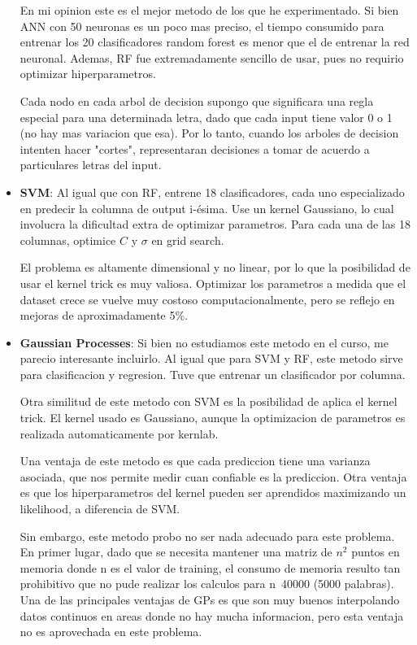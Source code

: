 \documentclass[paper=a4, fontsize=11pt]{scrartcl} %
\numberwithin{equation}{section} %
\numberwithin{figure}{section} %
\numberwithin{table}{section} %
\begin{document}
\begin{itemize}
En mi opinion este es el mejor metodo de los que he experimentado. Si bien ANN con 50 neuronas es un poco mas preciso, el tiempo consumido para entrenar los 20 clasificadores random forest es menor que el de entrenar la red neuronal. Ademas, RF fue extremadamente sencillo de usar, pues no requirio optimizar hiperparametros.

Cada nodo en cada arbol de decision supongo que significara una regla especial para una determinada letra, dado que cada input tiene valor 0 o 1 (no hay mas variacion que esa). Por lo tanto, cuando los arboles de decision intenten hacer "cortes", representaran decisiones a tomar de acuerdo a particulares letras del input.

\item \textbf{SVM}: Al igual que con RF, entrene 18 clasificadores, cada uno especializado en predecir la columna de output i-ésima. Use un kernel Gaussiano, lo cual involucra la dificultad extra de optimizar parametros. Para cada una de las 18 columnas, optimice $C$ y $\sigma$ en grid search.

El problema es altamente dimensional y no linear, por lo que la posibilidad de usar el kernel trick es muy valiosa. Optimizar los parametros a medida que el dataset crece se vuelve muy costoso computacionalmente, pero se reflejo en mejoras de aproximadamente 5\%.

\item \textbf{Gaussian Processes}: Si bien no estudiamos este metodo en el curso, me parecio interesante incluirlo\cite{gauss_processes}. Al igual que para SVM y RF, este metodo sirve para clasificacion y regresion. Tuve que entrenar un clasificador por columna. 

Otra similitud de este metodo con SVM es la posibilidad de aplica el kernel trick. El kernel usado es  Gaussiano, aunque la optimizacion de parametros es realizada automaticamente por kernlab.

Una ventaja de este metodo es que cada prediccion tiene una varianza asociada, que nos permite medir cuan confiable es la prediccion. Otra ventaja es que los hiperparametros del kernel pueden ser aprendidos maximizando un likelihood, a diferencia de SVM.

Sin embargo, este metodo probo no ser nada adecuado para este problema. En primer lugar, dado que se necesita mantener una matriz de $n^2$ puntos en memoria donde n es el valor de training, el consumo de memoria resulto tan prohibitivo que no pude realizar los calculos para n~40000 (5000 palabras). Una de las principales ventajas de GPs es que son muy buenos interpolando datos continuos en areas donde no hay mucha informacion, pero esta ventaja no es aprovechada en este problema.


\end{itemize}
\end{document}
